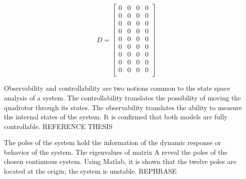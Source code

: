  \begin{equation}
 	D=\begin{bmatrix}
 	0 & 0 & 0 & 0 \\
 	0 & 0 & 0 & 0 \\
 	0 & 0 & 0 & 0 \\
 	0 & 0 & 0 & 0 \\
 	0 & 0 & 0 & 0 \\
 	0 & 0 & 0 & 0 \\
 	0 & 0 & 0 & 0 \\
 	0 & 0 & 0 & 0 \\
 	0 & 0 & 0 & 0 \\
 	\end{bmatrix}
 \end{equation}
 
Observability and controllability are two notions common to the state space analysis of a system. The controllability translates the possibility of moving the quadrotor through its states. The observability translates the ability to measure the internal states of the system. It is confirmed that both models are fully controllable. REFERENCE THESIS

The poles of the system hold the information of the dynamic response or behavior of the system. The eigenvalues of matrix A reveal the poles of the chosen continuous system. Using Matlab, it is shown that the twelve poles are located at the origin; the system is unstable. REPHRASE